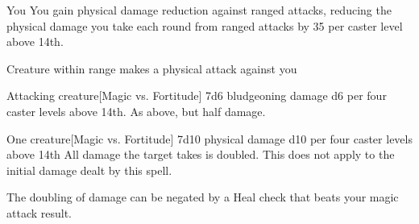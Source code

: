 \begin{spellheader}
    \spelldur{\durshort \dismissable}
\end{spellheader}
\begin{spelleffects}
    \begin{spelltarget}[Primary]{You}
        \spelleffect You gain physical damage reduction against ranged attacks, reducing the physical damage you take each round from ranged attacks by 35  per caster level above 14th.
    \end{spelltarget}
    \begin{spelltrigger}{Creature within \rngclose range makes a physical attack against you}
        \begin{spelltarget}[Secondary]{Attacking creature}[Magic vs. Fortitude]
            \spellsuccess 7d6 bludgeoning damage \add d6 per four caster levels above 14th.
            \spellfailure As above, but half damage.
        \end{spelltarget}
    \end{spelltrigger}
\end{spelleffects}
\begin{spellfooter}
    
\end{spellfooter}

\begin{spellheader}
    \spellrng{\rngclose}
    \spelldur{\durshort}
\end{spellheader}
\begin{spelleffects}
    \begin{spelltarget}{One creature}[Magic vs. Fortitude]
        \spelleffect 7d10 physical damage \add d10 per four caster levels above 14th
        \spellsuccess All damage the target takes is doubled. This does not apply to the initial damage dealt by this spell.
    \end{spelltarget}
\end{spelleffects}
\begin{spellfooter}
    \spellnotes The doubling of damage can be negated by a Heal check that beats your magic attack result.
\end{spellfooter}

